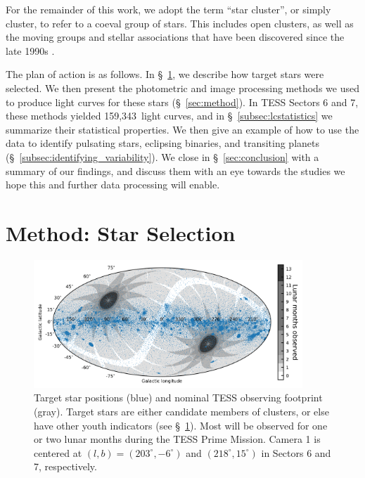 \documentclass[12pt,twocolumn,tighten]{aastex62}
\newcommand{\numberlcs}{159{,}343\ } %
\begin{document}
For the remainder of this work, we adopt the term ``star cluster'', or
simply cluster, to refer to a coeval group of stars.  This includes
open clusters, as well as the moving groups and stellar associations
that have been discovered since the late 1990s
\citep{zuckerman_young_2004}. 

The plan of action is as follows. In \S~\ref{sec:starselection}, we
describe how target stars were selected. We then present the
photometric and image processing methods we used to produce light
curves for these stars (\S~\ref{sec:method}).  In TESS Sectors 6 and
7, these methods yielded \numberlcs light curves, and in
\S~\ref{subsec:lcstatistics} we summarize their statistical
properties.  We then give an example of how to use the data to identify
pulsating stars, eclipsing binaries, and transiting planets
(\S~\ref{subsec:identifying_variability}).  We close in
\S~\ref{sec:conclusion} with a summary of our findings, and discuss them
with an eye towards the studies we hope this and further data
processing will enable.


\section{Method: Star Selection}
\label{sec:starselection}

\begin{figure}[!t]
	\begin{center}
		\leavevmode
		\includegraphics[width=0.9\textwidth]{target_star_positions.png}
	\end{center}
	\vspace{-0.5cm}
	\caption{
    Target star positions (blue) and nominal TESS observing footprint
    (gray).  Target stars are either candidate members of clusters, or
    else have other youth indicators (see \S~\ref{sec:starselection}).
    Most will be observed for one or two lunar months during the TESS
    Prime Mission.  Camera 1 is centered at $(l,b)=(203^\circ,
    -6^\circ)$ and $(218^\circ,15^\circ)$ in Sectors 6 and 7,
    respectively.
    \label{fig:cdips_targets_positions}
	}
\end{figure}
\end{document}
